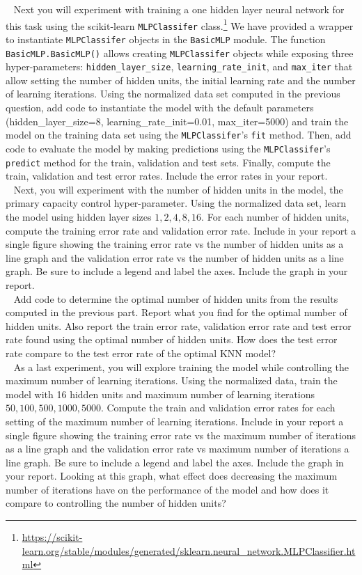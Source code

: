 \documentclass[11pt]{article}
\begin{document}
\begin{problem}{50}
~ Next you will experiment with training a one hidden layer neural network for this task using the scikit-learn \texttt{MLPClassifer} class.\footnote{\url{https://scikit-learn.org/stable/modules/generated/sklearn.neural_network.MLPClassifier.html}} We have provided a wrapper to instantiate \texttt{MLPClassifer} objects in the \texttt{BasicMLP} module. The function \texttt{BasicMLP.BasicMLP()} allows creating \texttt{MLPClassifer} objects while exposing three hyper-parameters: \texttt{hidden\_layer\_size}, \texttt{learning\_rate\_init}, and \texttt{max\_iter} that allow setting the number of hidden units, the initial learning rate and the number of learning iterations. Using the normalized data set computed in the previous question, add code to instantiate the model with the default parameters (hidden\_layer\_size=8, learning\_rate\_init=0.01, max\_iter=5000) and train the model on the training data set using the \texttt{MLPClassifer}'s \texttt{fit} method. Then, add code to evaluate the model by making predictions using the \texttt{MLPClassifer}'s \texttt{predict} method for the train, validation and test sets. Finally, compute the train, validation and test error rates. Include the error rates in your report.\\

~ Next, you will experiment with the number of hidden units in the model, the primary capacity control hyper-parameter. Using the normalized data set, learn the model using hidden layer sizes $1, 2, 4, 8, 16$. For each number of hidden units, compute the training error rate and validation error rate. Include in your report a single figure showing the training error rate vs the number of hidden units as a line graph and the validation error rate vs the number of hidden units as a line graph. Be sure to include a legend and label the axes. Include the graph in your report.\\

~ Add code to determine the optimal number of hidden units from the results computed in the previous part. Report what you find for the optimal number of hidden units. Also report the train error rate, validation error rate and test error rate found using the optimal number of hidden units. How does the test error rate compare to the test error rate of the optimal KNN model?\\

~ As a last experiment, you will explore training the model while controlling the maximum number of learning iterations. Using the normalized data, train the model with 16 hidden units and maximum number of learning iterations $50, 100, 500, 1000, 5000$. Compute the train and validation error rates for each setting of the maximum number of learning iterations. Include in your report a single figure showing the training error rate vs the maximum number of iterations as a line graph and the validation error rate vs maximum number of iterations a line graph. Be sure to include a legend and label the axes. Include the graph in your report. Looking at this graph, what effect does decreasing the maximum number of iterations have on the performance of the model and how does it compare to controlling the number of hidden units?

\end{problem}


\showpoints
\end{document}
